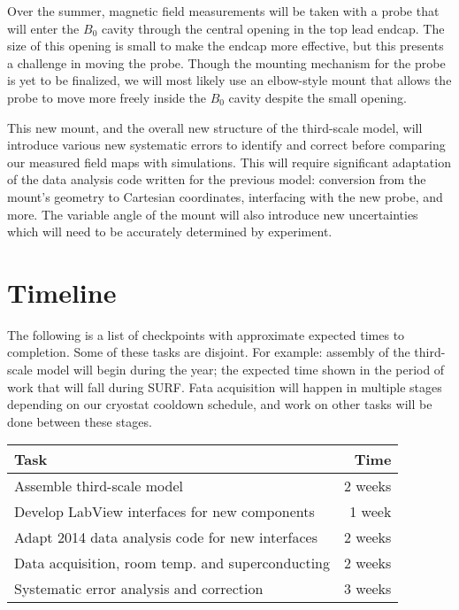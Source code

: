 \documentclass[twocolumn,aps,prb,citeautoscript]{revtex4-1}
\begin{document}
Over the summer, magnetic field measurements will be taken with a probe that will enter the $B_0$ cavity
through the central opening in the top lead endcap. The size of this opening is small to make the endcap
more effective, but this presents a challenge in moving the probe.
Though the mounting mechanism for the probe is yet to be finalized, we will most likely use an
elbow-style mount that allows the probe to move more freely inside the $B_0$ cavity despite the small opening.

This new mount, and the overall new structure of the third-scale model,
will introduce various new systematic errors to identify and correct before comparing our measured field maps
with simulations. This will require significant adaptation of
the data analysis code written for the previous model: conversion from the mount's geometry to
Cartesian coordinates, interfacing with the new probe, and more.
The variable angle of the mount will also
introduce new uncertainties which will need to be accurately determined by experiment.

\bigskip
\bigskip
\bigskip

\section{Timeline}

The following is a list of checkpoints with approximate expected times to completion. Some of these tasks
are disjoint. For example: assembly of the third-scale model will begin during the year; the expected time shown
in the period of work that will fall during SURF.
Fata acquisition will happen in multiple stages depending on our cryostat cooldown
schedule, and work on other tasks will be done between these stages.

\begin{table}[h!]
    \begin{tabular}{l|r}
        Task & Time \\\hline\hline
        Assemble third-scale model & 2 weeks \\
        Develop LabView interfaces for new components & 1 week \\
        Adapt 2014 data analysis code for new interfaces & 2 weeks \\
        Data acquisition, room temp. and superconducting & 2 weeks \\
        Systematic error analysis and correction & 3 weeks
    \end{tabular}
\end{table}
\end{document}
